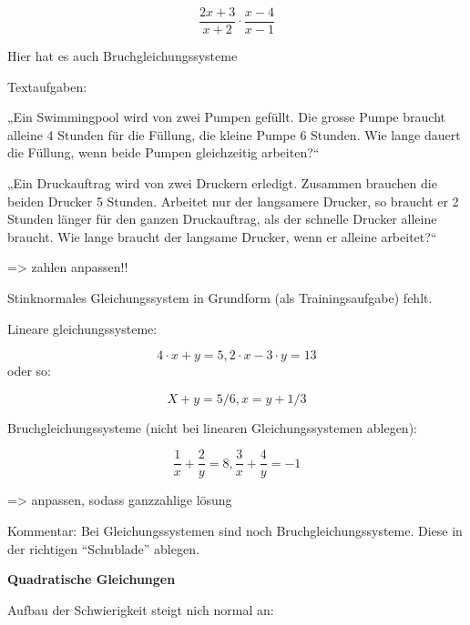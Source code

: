 



$$ \frac{2x + 3}{x + 2} \cdot \frac{x - 4}{x - 1}$$



Hier hat es auch Bruchgleichungssysteme

Textaufgaben: 

„Ein Swimmingpool wird von zwei Pumpen gefüllt. Die grosse Pumpe braucht alleine 4 Stunden für die Füllung, die kleine Pumpe 6 Stunden. Wie lange dauert die Füllung, wenn beide Pumpen gleichzeitig arbeiten?“ 

 

„Ein Druckauftrag wird von zwei Druckern erledigt. Zusammen brauchen die beiden Drucker 5 Stunden. Arbeitet nur der langsamere Drucker, so braucht er 2 Stunden länger für den ganzen Druckauftrag, als der schnelle Drucker alleine braucht. Wie lange braucht der langsame Drucker, wenn er alleine arbeitet?“ 

=> zahlen anpassen!!



Stinknormales Gleichungssystem in Grundform (als Trainingsaufgabe)
fehlt.

Lineare gleichungssysteme: 

$$4\cdot{}x+y=5, 2\cdot{}x-3\cdot{}y=13$$
oder so:

$$X+y=5/6, x=y+1/3 $$

Bruchgleichungssysteme (nicht bei linearen Gleichungssystemen ablegen): 

$$\frac{1}{x} + \frac{2}{y} = 8, \frac{3}{x} + \frac{4}{y} = -1 $$

=> anpassen, sodass ganzzahlige lösung

Kommentar: Bei Gleichungssystemen sind noch
Bruchgleichungssysteme. Diese in der richtigen ``Schublade'' ablegen.


\textbf{Quadratische Gleichungen}

Aufbau der Schwierigkeit steigt nich normal an:

